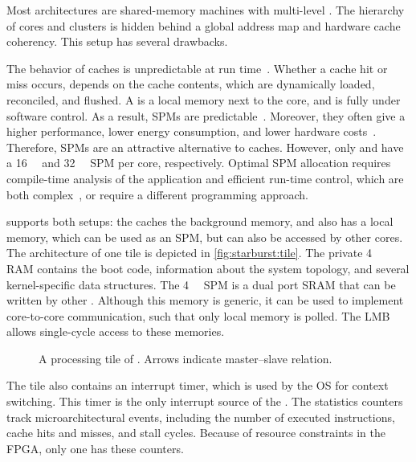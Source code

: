 Most architectures are shared-memory machines with multi-level .
The hierarchy of cores and clusters is hidden behind a global address map and hardware cache coherency.
This setup has several drawbacks.

The behavior of caches is unpredictable at run time~\cite{blake:multiproc_survey}.
Whether a cache hit or miss occurs, depends on the cache contents, which are dynamically loaded, reconciled, and flushed.
A  is a local memory next to the core, and is fully under software control.
As a result, \acp{SPM} are predictable~\cite{suhendra:spm}.
Moreover, they often give a higher performance, lower energy consumption, and lower hardware costs~\cite{nguyen:spm}.
Therefore, \acp{SPM} are an attractive alternative to caches.
However, only \IntelSCC and \Epiphany have a \SI{16}{\Kilo\byte} and \SI{32}{\Kilo\byte} \ac{SPM} per core, respectively.
Optimal \ac{SPM} allocation requires compile-time analysis of the application and efficient run-time control, which are both complex~\cite{blake:multiproc_survey}, or require a different programming approach.

\Starburst supports both setups: the \MicroBlaze caches the background memory, and also has a local memory, which can be used as an \ac{SPM}, but can also be accessed by other cores.
The architecture of one \MicroBlaze tile is depicted in \vref{fig:starburst:tile}.
The private \SI{4}{\Kilo\byte} \ac{RAM} contains the boot code, information about the system topology, and several kernel-specific data structures.
The \SI{4}{\Kilo\byte} \ac{SPM} is a dual port \ac{SRAM} that can be written by other \MicroBlazes.
Although this memory is generic, it can be used to implement core-to-core communication, such that only local memory is polled.
The \ac{LMB} allows single-cycle access to these memories.

\begin{figure}%
%
\caption{A processing tile of \Starburst. Arrows indicate master--slave relation.}%
\label{fig:starburst:tile}%
\end{figure}

The tile also contains an interrupt timer, which is used by the \ac{OS} for context switching.
This timer is the only interrupt source of the \MicroBlaze*.
The statistics counters track microarchitectural events, including the number of executed instructions, cache hits and misses, and stall cycles.
Because of resource constraints in the \ac{FPGA}, only one \MicroBlaze has these counters.


